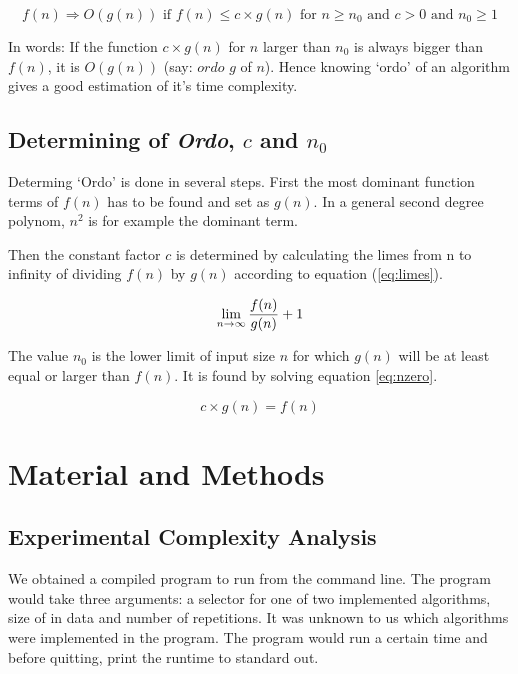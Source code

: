 \documentclass[a4paper,11pt,twoside]{article}
\begin{document}
\begin{equation} \label{eq:ordo}
f(n) \Rightarrow O(g(n)) \textrm{ if } f(n) \leq c \times g(n)
\textrm{ for } n \geq n_{0} \textrm{ and }
c > 0 \textrm{ and } n_{0} \geq 1
\end{equation}

In words: If the function $c \times g(n)$ for $n$ larger than $n_{0}$
is always bigger than $f(n)$, it is $O(g(n))$ (say: $ordo$  $g$ of
$n$). Hence knowing `ordo' of an algorithm gives a good estimation 
of it's time complexity.

\subsection{Determining of \textit{Ordo}, $c$ and $n_{0}$}
Determing `Ordo' is done in several steps. First the most dominant
function terms of $f(n)$ has to be found and set as $g(n)$. In a
general second degree polynom, $n^2$ is for example the dominant term.

Then the constant factor $c$ is determined by calculating the limes
from n to infinity of dividing $f(n)$ by $g(n)$ according to
equation (\ref{eq:limes}).  

\begin{equation} \label{eq:limes}
\lim_{n \to \infty} {f(n) \over g(n)} + 1
\end{equation}

The value $n_{0}$ is the lower limit of input size $n$ for which
$g(n)$ will be at least equal or larger than $f(n)$. It is found by
solving equation \ref{eq:nzero}. 

\begin{equation} \label{eq:nzero}
c\times g(n) = f(n)
\end{equation}


\section{Material and Methods}

\subsection{Experimental Complexity Analysis}
We obtained a compiled program to run from the command line. The
program would take three arguments: a selector for one of two
implemented algorithms, size of in data and number of repetitions. It
was unknown to us which algorithms were implemented in the
program. The program would run a certain time and before quitting, 
print the runtime to standard out.
\end{document}
